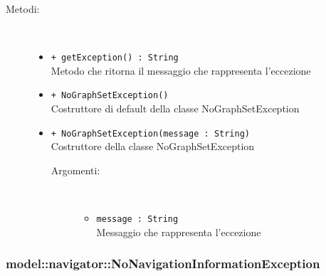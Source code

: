 \documentclass[../DefinizioneDiProdotto.tex]{subfiles}
\begin{document}
\begin{description}
\begin{itemize}
\end{itemize}
\item[Metodi:] \
\begin{itemize}
\item \texttt{+ getException() : String}\\
Metodo che ritorna il messaggio che rappresenta l'eccezione
 \item \texttt{+ NoGraphSetException()}\\
Costruttore di default della classe NoGraphSetException
 \item \texttt{+ NoGraphSetException(message : String)}\\
Costruttore della classe NoGraphSetException
 \begin{description}
\item[Argomenti:] \
\begin{itemize}
\item \texttt{message : String}\\
Messaggio che rappresenta l'eccezione\end{itemize}
\end{description}
\end{itemize}
\end{description}

\subsubsection{model::navigator::NoNavigationInformationException}
\end{document}
